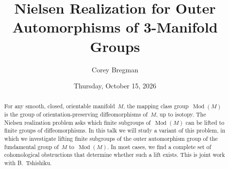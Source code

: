 \documentclass{UAmathtalk}
\author{Corey Bregman}
\title{Nielsen Realization for Outer Automorphisms of 3-Manifold Groups}
\date{Thursday, October 15, 2026}
\begin{document}
\maketitle

\begin{abstract}
For any smooth, closed, orientable manifold~$M$, the mapping class group~$\operatorname{Mod}(M)$ is the group of orientation-preserving diffeomorphisms of~$M$, up to isotopy. The Nielsen realization problem asks which finite subgroups of~$\operatorname{Mod}(M)$ can be lifted to finite groups of diffeomorphisms.  In this talk we will study a variant of this problem, in which we investigate lifting finite subgroups of the outer automorphism group of the fundamental group of~$M$ to~$\operatorname{Mod}(M)$.  In most cases, we find a complete set of cohomological obstructions that determine whether such a lift exists. This is joint work with B.~Tshishiku.
\end{abstract}
\end{document}
